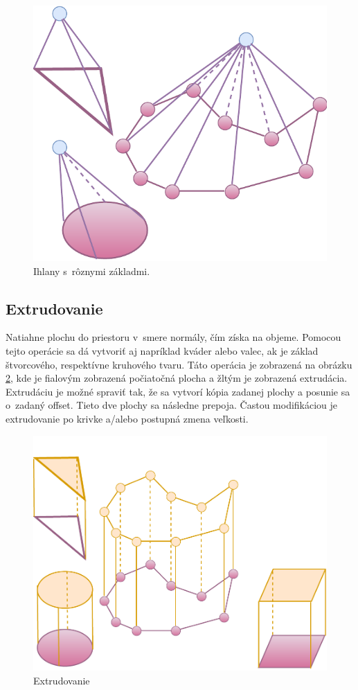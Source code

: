 

\begin{figure}[H]
	\centering
	\includegraphics[height=0.3\textwidth]{obrazky-figures/Diagram/Draw/4Object/DP Navrh operacii-3D - ObjectsCreate Pyramid.pdf}
	\caption{Ihlany s~rôznymi základmi.}
	\label{fig:ObjectsCreate Pyramid}
\end{figure}


\subsection*{Extrudovanie} 
Natiahne plochu do priestoru v~smere normály, čím získa na objeme. Pomocou tejto operácie sa dá vytvoriť aj napríklad kváder alebo valec, ak je základ štvorcového, respektívne kruhového tvaru. Táto operácia je zobrazená na obrázku \ref{fig:ObjectsExtrude}, kde je fialovým zobrazená počiatočná plocha a žltým je zobrazená extrudácia. Extrudáciu je možné spraviť tak, že sa vytvorí kópia zadanej plochy a posunie sa o~zadaný offset. Tieto dve plochy sa následne prepoja. Častou modifikáciou je extrudovanie po krivke a/alebo postupná zmena veľkosti. 




\begin{figure}[H]
	\centering
	\includegraphics[height=0.3\textwidth]{obrazky-figures/Diagram/Draw/4Object/DP Navrh operacii-3D - ObjectsExtrude.pdf}
	\caption{Extrudovanie}
	\label{fig:ObjectsExtrude}
\end{figure}


